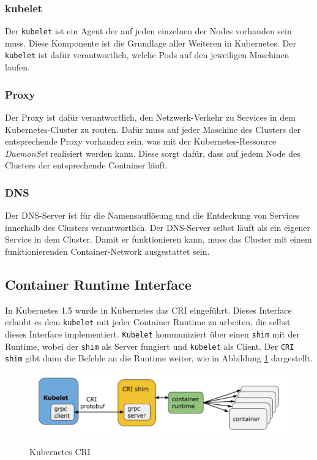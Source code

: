 \subsubsection{kubelet}
Der \texttt{kubelet} ist ein Agent der auf jeden einzelnen der Nodes vorhanden sein muss.
Diese Komponente ist die Grundlage aller Weiteren in Kubernetes.
Der \texttt{kubelet} ist dafür verantwortlich, welche Pods auf den jeweiligen Maschinen laufen.

\subsubsection{Proxy}
Der Proxy ist dafür verantwortlich, den Netzwerk-Verkehr zu Services in dem Kubernetes-Cluster zu routen. 
Dafür muss auf jeder Maschine des Clusters der entsprechende Proxy vorhanden sein, was mit der Kubernetes-Ressource \textit{DaemonSet} realisiert werden kann.
Diese sorgt dafür, dass auf jedem Node des Clusters der entsprechende Container läuft.\cite[S.34]{Kubernetes_up_and_running}

\subsubsection{DNS}
Der \ac{DNS}-Server ist für die Namensauflösung und die Entdeckung von Services innerhalb des Clusters verantwortlich. 
Der \ac{DNS}-Server selbst läuft als ein eigener Service in dem Cluster.
Damit er funktionieren kann, muss das Cluster mit einem funktionierenden Container-Network ausgestattet sein. 
\cite[S.34 f]{Kubernetes_up_and_running}


\subsection{Container Runtime Interface}
In Kubernetes 1.5 wurde in Kubernetes das \ac{CRI} eingeführt.
Dieses Interface erlaubt es dem \texttt{kubelet} mit jeder Container Runtime zu arbeiten, die selbst dieses Interface implementiert. 
\texttt{Kubelet} kommuniziert über einen \texttt{shim} mit der Runtime, wobei der \texttt{shim} als Server fungiert und \texttt{kubelet} als Client.
Der \texttt{\ac{CRI} shim} gibt dann die Befehle an die Runtime weiter, wie in Abbildung \ref{fig:cri} dargestellt.
\begin{figure}[ht]
        \caption{Kubernetes \ac{CRI}\cite{kubernetes_cri}}
        \centering
        \includegraphics[width=\textwidth]{bilder/kubernetes_cri.png}
        \label{fig:cri}
\end{figure}
\cite{kubernetes_cri}

